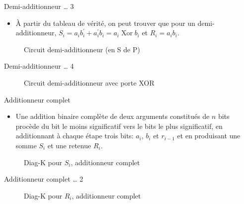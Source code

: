 \documentclass[presentation]{beamer}
\begin{document}
\begin{frame}[label={sec:org9343fc0}]{Demi-additionneur \ldots{} 3}
\begin{itemize}
\item À partir du tableau de vérité, on peut trouver que pour un demi-additionneur, \(S_{i} = a_i b_i^\prime + a_i^\prime b_i = a_i \operatorname{Xor} b_i\) et \(R_{i} = a_i b_i\).
\end{itemize}

\begin{figure}[htbp]
\centering

\caption{\label{fig:orgc9424e9}Circuit demi-additionneur (en S de P)}
\end{figure}
\end{frame}

\begin{frame}[label={sec:org5f43190}]{Demi-additionneur \ldots{} 4}
\begin{figure}[htbp]
\centering

\caption{\label{fig:org058dbb3}Circuit demi-additionneur avec porte XOR}
\end{figure}
\end{frame}

\begin{frame}[label={sec:org5dbc6d2}]{Additionneur complet}
\begin{itemize}
\item Une addition binaire complète de deux arguments constitués de \(n\) bits procède du bit le moins significatif vers le bits le plus significatif, en additionnant à chaque étape trois bits: \(a_{i}\), \(b_{i}\) et \(r_{i-1}\) et en produisant une somme \(S_{i}\) et une retenue \(R_{i}\).
\end{itemize}


\begin{figure}[htbp]
\centering

\caption{\label{fig:org0b8c5d2}Diag-K pour \(S_i\), additionneur complet}
\end{figure}
\end{frame}

\begin{frame}[label={sec:orgd36481e}]{Additionneur complet \ldots{} 2}
\begin{figure}[htbp]
\centering

\caption{\label{fig:org86d1473}Diag-K pour \(R_i\), additionneur complet}
\end{figure}
\end{frame}
\end{document}
